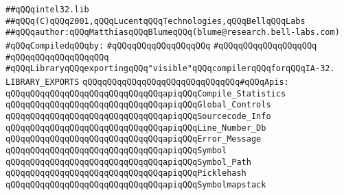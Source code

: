 \label{src/lib/core/compiler/mythryl-compiler-for-intel32.lib}
\verb|##qQQqintel32.lib|\newline
\verb|##qQQq(C)qQQq2001,qQQqLucentqQQqTechnologies,qQQqBellqQQqLabs|\newline
\verb|##qQQqauthor:qQQqMatthiasqQQqBlumeqQQq(blume@research.bell-labs.com)|\newline
\newline
\verb|#qQQqCompiledqQQqby:|\newline
\verb|#qQQqqQQqqQQqqQQqqQQq|\newline
\verb|#qQQqqQQqqQQqqQQqqQQq|\newline
\verb|#qQQqqQQqqQQqqQQqqQQq|\newline
\newline
\verb|#qQQqLibraryqQQqexportingqQQq"visible"qQQqcompilerqQQqforqQQqIA-32.|\newline
\newline
\newline
\verb|LIBRARY_EXPORTS|\newline
\newline
\verb|qQQqqQQqqQQqqQQqqQQqqQQqqQQqqQQq#qQQqApis:|\newline
\verb|qQQqqQQqqQQqqQQqqQQqqQQqqQQqqQQqapiqQQqCompile_Statistics|\newline
\verb|qQQqqQQqqQQqqQQqqQQqqQQqqQQqqQQqapiqQQqGlobal_Controls|\newline
\verb|qQQqqQQqqQQqqQQqqQQqqQQqqQQqqQQqapiqQQqSourcecode_Info|\newline
\verb|qQQqqQQqqQQqqQQqqQQqqQQqqQQqqQQqapiqQQqLine_Number_Db|\newline
\verb|qQQqqQQqqQQqqQQqqQQqqQQqqQQqqQQqapiqQQqError_Message|\newline
\verb|qQQqqQQqqQQqqQQqqQQqqQQqqQQqqQQqapiqQQqSymbol|\newline
\verb|qQQqqQQqqQQqqQQqqQQqqQQqqQQqqQQqapiqQQqSymbol_Path|\newline
\verb|qQQqqQQqqQQqqQQqqQQqqQQqqQQqqQQqapiqQQqPicklehash|\newline
\verb|qQQqqQQqqQQqqQQqqQQqqQQqqQQqqQQqapiqQQqSymbolmapstack|\newline
